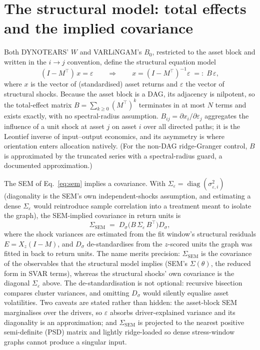 \section{The structural model: total effects and the implied covariance}
\label{sec:sem}

Both DYNOTEARS' $W$ and VARLiNGAM's $B_0$, restricted to the asset block and
written in the $i\to j$ convention, define the structural equation model
\begin{equation}
  (I - M^\top)\, x = \varepsilon
  \qquad\Longrightarrow\qquad
  x = (I - M^\top)^{-1} \varepsilon \;=:\; B\,\varepsilon,
  \label{eq:sem}
\end{equation}
where $x$ is the vector of (standardised) asset returns and $\varepsilon$ the
vector of structural shocks. Because the asset block is a DAG, its adjacency
is nilpotent, so the total-effect matrix
$B = \sum_{k\ge 0} (M^\top)^k$ terminates in at most $N$ terms and exists
exactly, with no spectral-radius assumption. $B_{ij} = \partial x_i / \partial
\varepsilon_j$ aggregates the influence of a unit shock at asset $j$ on asset
$i$ over all directed paths; it is the Leontief inverse of
input--output economics, and its asymmetry is where orientation enters
allocation natively. (For the non-DAG ridge-Granger control, $B$ is approximated
by the truncated series with a spectral-radius guard, a documented
approximation.)

The SEM of Eq.~\eqref{eq:sem} implies a covariance. With $\Sigma_\varepsilon =
\operatorname{diag}(\sigma^2_{\varepsilon,i})$ (diagonality is the SEM's
own independent-shocks assumption, and estimating a dense
$\Sigma_\varepsilon$ would reintroduce sample correlation into a treatment
meant to isolate the graph), the SEM-implied covariance in return
units is
\begin{equation}
  \Sigma_{\mathrm{SEM}}
  \;=\; D_\sigma \big( B\, \Sigma_\varepsilon\, B^\top \big) D_\sigma ,
  \label{eq:sigma-sem}
\end{equation}
where the shock variances are estimated from the fit window's structural
residuals $E = X_z (I - M)$, and $D_\sigma$ de-standardises from the
$z$-scored units the graph was fitted in back to return units. The name
merits precision: $\Sigma_{\mathrm{SEM}}$ is the covariance of the
observables that the structural model implies (SEM's $\Sigma(\theta)$,
the reduced form in SVAR terms), whereas the structural shocks' own
covariance is the diagonal $\Sigma_\varepsilon$ above. The
de-standardisation is not optional: recursive bisection compares cluster
variances, and omitting $D_\sigma$ would silently equalise asset
volatilities. Two caveats are stated rather than hidden: the asset-block SEM
marginalises over the drivers, so $\varepsilon$ absorbs driver-explained
variance and its diagonality is an approximation; and
$\Sigma_{\mathrm{SEM}}$ is projected to the nearest positive semi-definite
(PSD) matrix and lightly ridge-loaded
so dense stress-window graphs cannot produce a singular input.

